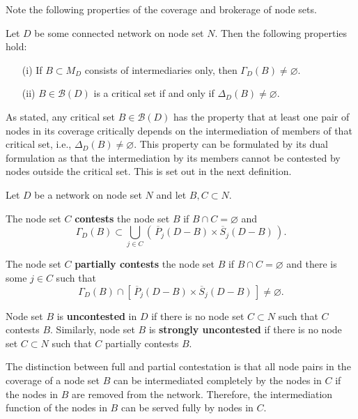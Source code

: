Note the following properties of the coverage and brokerage of node sets.
\begin{property}
Let $D$ be some connected network on node set $N$. Then the following properties hold:
\begin{itemize}
\item[(i)] If $B \subset M_D$ consists of intermediaries only, then $\Gamma_D (B) \neq \varnothing$.

\item[(ii)] $B \in \mathcal{B} (D)$ is a critical set if and only if $\Delta_D (B) \neq \varnothing$.
\end{itemize}
\end{property}
As stated, any critical set $B \in \mathcal{B} (D)$ has the property that at least one pair of nodes in its coverage critically depends on the intermediation of members of that critical set, i.e., $\Delta_D (B) \neq \varnothing$. This property can be formulated by its dual formulation as that the intermediation by its members cannot be contested by nodes outside the critical set. This is set out in the next definition.
\begin{definition} \label{contest}
Let $D$ be a network on node set $N$ and let $B,C \subset N$.
\begin{abet}
\item The node set $C$ \textbf{contests} the node set $B$ if $B \cap C = \varnothing$ and
\begin{equation}
\Gamma_D (B) \subset \bigcup_{j \in C} \left( \, \overline{P}_{j}(D - B) \times \overline{S}_{j}(D - B) \, \right) .
\end{equation}

\item The node set $C$ \textbf{partially contests} the node set $B$ if $B \cap C = \varnothing$ and there is some $j \in C$ such that
\begin{equation}
\Gamma_D (B) \cap \left[ \, \overline{P}_{j}(D - B) \times \overline{S}_{j}(D - B) \, \right] \neq \varnothing.
\end{equation}

\item Node set $B$ is \textbf{uncontested} in $D$ if there is no node set $C \subset N$ such that $C$ contests $B$. Similarly, node set $B$ is \textbf{strongly uncontested} if there is no node set $C \subset N$ such that $C$ partially contests $B$.
\end{abet}
\end{definition}
The distinction between full and partial contestation is that all node pairs in the coverage of a node set $B$ can be intermediated completely by the nodes in $C$ if the nodes in $B$ are removed from the network. Therefore, the intermediation function of the nodes in $B$ can be served fully by nodes in $C$.

